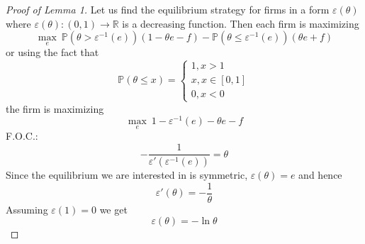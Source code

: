 \documentclass[a4paper]{article}
\newcommand{\prob}{\mathbb{P}}
\begin{document}
\begin{proof}[Proof of Lemma 1]
	Let us find the equilibrium strategy for firms in a form $\varepsilon(\theta)$ where $\varepsilon(\theta):(0, 1) \to \mathbb{R}$ is a decreasing function. Then each firm is maximizing $$\underset{e}{\max}\ \prob(\theta > \varepsilon^{-1}(e))(1 - \theta e - f) - \prob(\theta \le \varepsilon^{-1}(e))(\theta e + f)$$
	or using the fact that $$\prob(\theta \le x) = \begin{cases}
	1, x > 1\\
	x, x \in [0, 1]\\
	0, x < 0
	\end{cases}$$
	the firm is maximizing
	$$\underset{e}{\max}\ 1 - \varepsilon^{-1}(e) - \theta e - f$$
	F.O.C.:
	$$-\frac{1}{\varepsilon'(\varepsilon^{-1}(e))} = \theta$$
	Since the equilibrium we are interested in is symmetric, $\varepsilon(\theta) = e$ and hence
	$$\varepsilon'(\theta) = -\frac{1}{\theta}$$
	Assuming $\varepsilon(1) = 0$ we get $$\varepsilon(\theta) = -\ln\theta$$ 
\end{proof}
\end{document}
